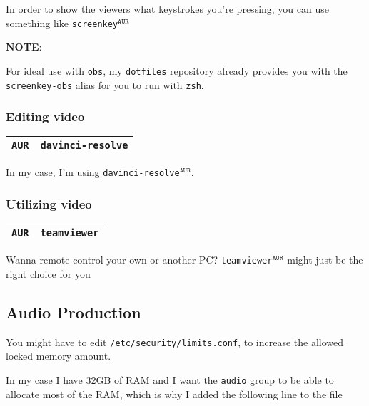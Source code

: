 \documentclass[9pt]{report}
\newcommand{\admonition}[2]{\textbf{#1}: {#2}}
\begin{document}
In order to show the viewers what keystrokes you’re pressing, you can use something like \texttt{screenkey}${}^{\texttt{AUR}}$


\admonition{NOTE}{For ideal use with \texttt{obs}, my \texttt{dotfiles} repository already provides you with the \texttt{screenkey-obs} alias for you to run with \texttt{zsh}.

}

\vfill\eject

\hypertarget{x-editing-video}{\subsubsection{Editing video}}
\begin{center}
\begin{tabular}{|c|c|}
\hline
\texttt{AUR} & \texttt{davinci-resolve} \\ 
\hline
\end{tabular}
\end{center}

In my case, I’m using \texttt{davinci-resolve}${}^{\texttt{AUR}}$.



\vfill\eject

\hypertarget{x-utilizing-video}{\subsubsection{Utilizing video}}
\begin{center}
\begin{tabular}{|c|c|}
\hline
\texttt{AUR} & \texttt{teamviewer} \\ 
\hline
\end{tabular}
\end{center}

Wanna remote control your own or another PC?
\texttt{teamviewer}${}^{\texttt{AUR}}$ might just be the right choice for you



\vfill\eject

\hypertarget{x-audio-production}{\subsection{Audio Production}}
You might have to edit \texttt{/etc/security/limits.conf}, to increase the allowed locked memory amount.


In my case I have 32GB of RAM and I want the \texttt{audio} group to be able to allocate most of the RAM, which is why I added the following line to the file
\end{document}
